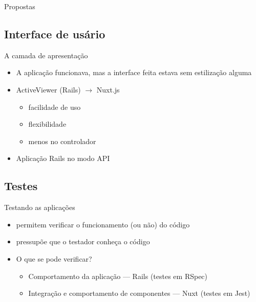 \documentclass[aspectratio=43,display]{beamer}
\begin{document}
  \begin{frame}{Propostas}
    \tableofcontents[currentsection]
  \end{frame}

  \subsection{Interface de usário}\label{subsec:interface}

  \begin{frame}{A camada de apresentação}
    \begin{itemize}
      \item A aplicação funcionava, mas a interface feita estava sem estilização alguma \pause
      \item ActiveViewer (Rails) $\rightarrow $ Nuxt.js %
      \begin{itemize}
        \item facilidade de uso \pause
        \item flexibilidade  \pause %
        \item menos  no controlador \pause
      \end{itemize}
      \item Aplicação Rails no modo API
    \end{itemize}
  \end{frame}

  \subsection{Testes}\label{subsec:testes}

  \begin{frame}{Testando as aplicações}
    \begin{itemize}
      \item permitem verificar o funcionamento (ou não) do código \pause
      \item pressupõe que o testador conheça o código \pause %
      \item O que se pode verificar?
      \begin{itemize}
        \item Comportamento da aplicação --- Rails (testes em RSpec) \pause %
        \item Integração e comportamento de componentes --- Nuxt (testes em Jest) %
      \end{itemize}
    \end{itemize}
  \end{frame}
\end{document}
